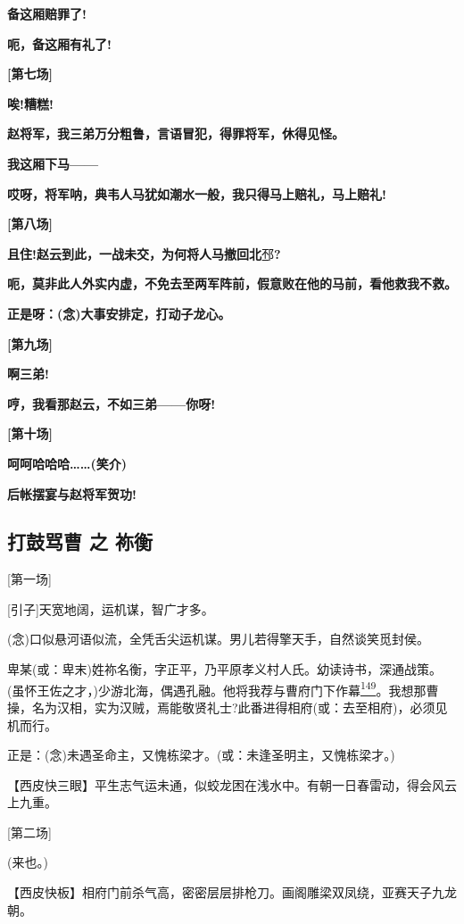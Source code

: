 \textbf{备这厢赔罪了!}

\textbf{呃，备这厢有礼了!}

\textbf{{[}第七场{]}}

\textbf{唉!糟糕!}

\textbf{赵将军，我三弟万分粗鲁，言语冒犯，得罪将军，休得见怪。}

\textbf{我这厢下马------}

\textbf{哎呀，将军呐，典韦人马犹如潮水一般，我只得马上赔礼，马上赔礼!}

\textbf{{[}第八场{]}}

\textbf{且住!赵云到此，一战未交，为何将人马撤回北}邳\textbf{?}

\textbf{呃，莫非此人外实内虚，不免去至两军阵前，假意败在他的马前，看他救我不救。}

\textbf{正是呀：(念)大事安排定，打动子龙心。}

\textbf{{[}第九场{]}}

\textbf{啊三弟!}

\textbf{哼，我看那赵云，不如三弟------你呀!}

\textbf{{[}第十场{]}}

\textbf{呵呵哈哈哈\ldots{}\ldots{}(笑介)}

\textbf{后帐摆宴与赵将军贺功!}

\hypertarget{ux6253ux9f13ux9a82ux66f9-ux4e4b-ux7962ux8861}{%
\subsection{打鼓骂曹 之
祢衡}\label{ux6253ux9f13ux9a82ux66f9-ux4e4b-ux7962ux8861}}

{[}第一场{]}

{[}引子{]}天宽地阔，运机谋，智广才多。

(念)口似悬河语似流，全凭舌尖运机谋。男儿若得擎天手，自然谈笑觅封侯。

卑某(或：卑末)姓祢名衡，字正平，乃平原孝义村人氏。幼读诗书，深通战策。(虽怀王佐之才，)少游北海，偶遇孔融。他将我荐与曹府门下作幕\protect\hyperlink{fn149}{\textsuperscript{149}}。我想那曹操，名为汉相，实为汉贼，焉能敬贤礼士?此番进得相府(或：去至相府)，必须见机而行。

正是：(念)未遇圣命主，又愧栋梁才。(或：未逢圣明主，又愧栋梁才。)

【西皮快三眼】平生志气运未通，似蛟龙困在浅水中。有朝一日春雷动，得会风云上九重。

{[}第二场{]}

(来也。)

【西皮快板】相府门前杀气高，密密层层排枪刀。画阁雕梁双凤绕，亚赛天子九龙朝。

